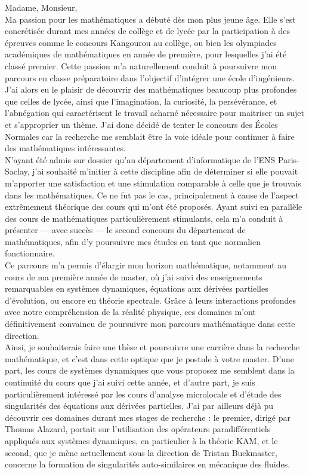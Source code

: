 \documentclass[12pt,a4paper]{article}
\begin{document}
Madame, Monsieur, \\

Ma passion pour les mathématiques a débuté dès mon plus jeune âge. Elle s’est concrétisée durant mes années de collège et de lycée par la participation à des épreuves comme le concours Kangourou au collège, ou bien les olympiades académiques de mathématiques en année de première, pour lesquelles j’ai été classé premier.  Cette passion m’a naturellement conduit à poursuivre mon parcours en classe préparatoire dans l’objectif d’intégrer une école d’ingénieurs.  \\

J'ai alors eu le plaisir de découvrir des mathématiques beaucoup plus profondes que celles de lycée, ainsi que l’imagination, la curiosité, la persévérance, et l’abnégation qui caractérisent le travail acharné nécessaire pour maitriser un sujet et s'approprier un thème. J'ai donc décidé de tenter le concours des Écoles Normales car la recherche me semblait être la voie idéale pour continuer à faire des mathématiques intéressantes. \\

N’ayant été admis sur dossier qu’au département d’informatique de l’ENS Paris-Saclay, j’ai souhaité m'initier à cette discipline afin de déterminer si elle pouvait m’apporter une satisfaction et une stimulation comparable à celle que je trouvais dans les mathématiques. Ce ne fut pas le cas, principalement à cause de l'aspect extrêmement théorique des cours qui m'ont été proposés. Ayant suivi en parallèle des cours de mathématiques particulièrement stimulants, cela m’a conduit à présenter — avec succès — le second concours du département de mathématiques, afin d’y poursuivre mes études en tant que normalien fonctionnaire.\\

Ce parcours m’a permis d’élargir mon horizon mathématique, notamment au cours de ma première année de master, où j’ai suivi des enseignements remarquables en systèmes dynamiques, équations aux dérivées partielles d’évolution, ou encore en théorie spectrale. Grâce à leurs interactions profondes avec notre compréhension de la réalité physique, ces domaines m’ont définitivement convaincu de poursuivre mon parcours mathématique dans cette direction.\\

Ainsi, je souhaiterais faire une thèse et poursuivre une carrière dans la recherche mathématique, et c'est dans cette optique que je postule à votre master. D'une part, les cours de systèmes dynamiques que vous proposez me semblent dans la continuité du cours que j'ai suivi cette année, et d'autre part, je suis particulièrement intéressé par les cours d'analyse microlocale et d'étude des singularités des équations aux dérivées partielles. J'ai par ailleurs déjà pu découvrir ces domaines durant mes stages de recherche : le premier, dirigé par Thomas Alazard, portait sur l'utilisation des opérateurs paradifférentiels appliqués aux systèmes dynamiques, en particulier à la théorie KAM, et le second, que je mène actuellement sous la direction de Tristan Buckmaster, concerne la formation de singularités auto-similaires en mécanique des fluides. \\
\end{document}
